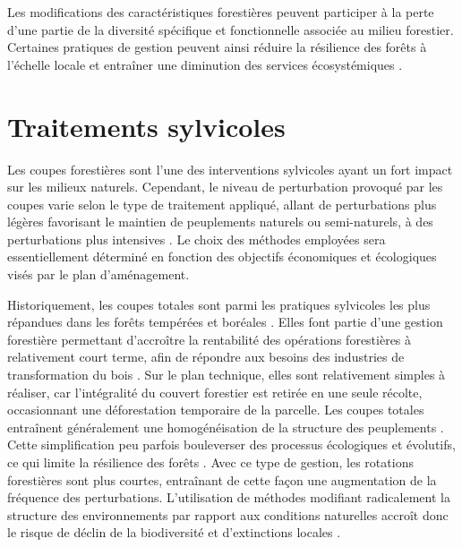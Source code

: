 Les modifications des caractéristiques forestières peuvent participer à la perte d'une partie de la diversité spécifique et fonctionnelle associée au milieu forestier. 
Certaines pratiques de gestion peuvent ainsi réduire la résilience des forêts à l'échelle locale et entraîner une diminution des services écosystémiques \citep{Hooper2012globalsynthesis,Edwards2014Maintainingecosystem}. 


\section*{Traitements sylvicoles}
\label{sec:sylvicole}

Les coupes forestières sont l'une des interventions sylvicoles ayant un fort impact sur les milieux naturels. 
Cependant, le niveau de perturbation provoqué par les coupes varie selon le type de traitement appliqué, allant de perturbations plus légères favorisant le maintien de peuplements naturels ou semi-naturels, à des perturbations plus intensives \citep{Ameray2021Forestcarbon}. 
Le choix des méthodes employées sera essentiellement déterminé en fonction des objectifs économiques et écologiques visés par le plan d'aménagement.

Historiquement, les coupes totales sont parmi les pratiques sylvicoles les plus répandues dans les forêts tempérées et boréales \citep{Fedrowitz2014Canretention,Chaudhary2016Impactforest}. 
Elles font partie d’une gestion forestière permettant d’accroître la rentabilité des opérations forestières à relativement court terme, afin de répondre aux besoins des industries de transformation du bois \citep{Irland2011TimberProductivitya}. 
Sur le plan technique, elles sont relativement simples à réaliser, car l'intégralité du couvert forestier est retirée en une seule récolte, occasionnant une déforestation temporaire de la parcelle. 
Les coupes totales entraînent généralement une homogénéisation de la structure des peuplements \citep{Brashears2004AssessmentCanopy,Martin2020Forestmanagement}. 
Cette simplification peu parfois bouleverser des processus écologiques et évolutifs, ce qui limite la résilience des forêts \citep{Holling2001UnderstandingComplexity}. 
Avec ce type de gestion, les rotations forestières sont plus courtes, entraînant de cette façon une augmentation de la fréquence des perturbations. 
L’utilisation de méthodes modifiant radicalement la structure des environnements par rapport aux conditions naturelles accroît donc le risque de déclin de la biodiversité et d’extinctions locales \citep{Hanski2000Extinctiondebt}. 

